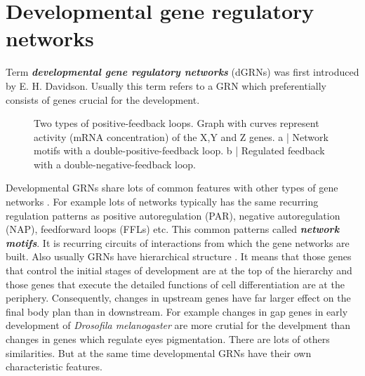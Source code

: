 \documentclass[a4paper, oneside]{report}
\begin{document}
\section*{Developmental gene regulatory networks}

Term \textbf{\textit{developmental gene regulatory networks}} (dGRNs) was first introduced by E. H. Davidson.
Usually this term refers to a GRN which preferentially consists of genes crucial for the development. 

\begin{figure}[h]
\caption{Two types of positive-feedback loops. Graph with curves represent activity (mRNA concentration) of the X,Y and Z genes. 
a | Network motifs with a double-positive-feedback loop.
b | Regulated feedback with a double-negative-feedback loop.}
\end{figure}

Developmental GRNs share lots of common features with other types of gene networks \cite{Alon2007}.
For example lots of networks typically has the same recurring regulation patterns as positive autoregulation (PAR), negative autoregulation (NAP), feedforward loops (FFLs) etc.
This common patterns called \textbf{\textit{network motifs}}.
It is recurring circuits of interactions from which the gene networks are built.
Also usually GRNs have hierarchical structure \cite{Erwin2009}.
It means that those genes that control the initial stages of development are at the top of the hierarchy and those genes that execute the detailed functions of cell differentiation are at the periphery.
Consequently, changes in upstream genes have far larger effect on the final body plan than in downstream.
For example changes in gap genes in early development of \textit{Drosofila melanogaster} are more crutial for the develpment than changes in genes which regulate eyes pigmentation.
There are lots of others similarities.
But at the same time developmental GRNs have their own characteristic features.
\end{document}
